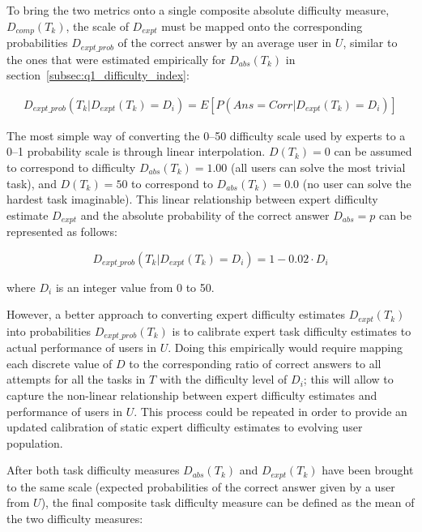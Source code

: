 To bring the two metrics onto a single composite absolute difficulty measure, $D_{comp}(T_k)$, the scale of $D_{expt}$ must be mapped onto the corresponding probabilities $D_{expt\_prob}$ of the correct answer by an average user in $U$, similar to the ones that were estimated empirically for $D_{abs}(T_k)$ in section~\ref{subsec:q1_difficulty_index}:

\begin{equation}
    \begin{split}
        D_{expt\_prob}(T_k | D_{expt}(T_k) = D_i) = E[P(Ans=Corr | D_{expt}(T_k) = D_i)]
    \end{split}
\end{equation}

The most simple way of converting the 0--50 difficulty scale used by experts to a 0--1 probability scale is through linear interpolation.
$D(T_k)=0$ can be assumed to correspond to difficulty $D_{abs}(T_k)=1.00$ (all users can solve the most trivial task), and $D(T_k)=50$ to correspond to $D_{abs}(T_k)=0.0$ (no user can solve the hardest task imaginable).
This linear relationship between expert difficulty estimate $D_{expt}$ and the absolute probability of the correct answer $D_{abs}=p$ can be represented as follows:

\begin{equation} \label{eq:dexpt_to_dabs_conversion}
    D_{expt\_prob}(T_k | D_{expt}(T_k) = D_i) = 1 - 0.02 \cdot D_i
\end{equation}

where $D_i$ is an integer value from 0 to 50.

However, a better approach to converting expert difficulty estimates $D_{expt}(T_k)$ into probabilities $D_{expt\_prob}(T_k)$ is to calibrate expert task difficulty estimates to actual performance of users in $U$.
Doing this empirically would require mapping each discrete value of $D$ to the corresponding ratio of correct answers to all attempts for all the tasks in $T$ with the difficulty level of $D_i$;
this will allow to capture the non-linear relationship between expert difficulty estimates and performance of users in $U$.
This process could be repeated in order to provide an updated calibration of static expert difficulty estimates to evolving user population.

After both task difficulty measures $D_{abs}(T_k)$ and $D_{expt}(T_k)$ have been brought to the same scale (expected probabilities of the correct answer given by a user from $U$), the final composite task difficulty measure can be defined as the mean of the two difficulty measures:

